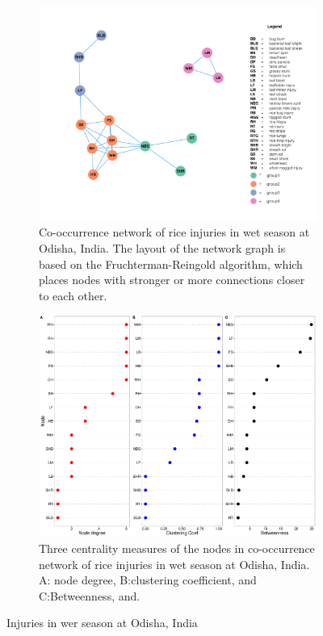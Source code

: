 \begin{figure}
    \centering
    \begin{subfigure}[b]{1\textwidth}
        \includegraphics[width = 1\textwidth]{figures/networkOR_ws/networkOR_ws.pdf}
        \caption{Co-occurrence network of rice injuries in wet season at Odisha, India. The layout of the network graph is based on the Fruchterman-Reingold algorithm, which places nodes with stronger or more connections closer to each other.}
        \label{fig:gull}
    \end{subfigure}
    \begin{subfigure}[b]{1\textwidth}
        \includegraphics[width = 1\textwidth]{figures/nodepropOR_ws/nodepropOR_ws.pdf}
        \caption{Three centrality measures of the nodes in co-occurrence network of rice injuries in wet season at Odisha, India. A: node degree, B:clustering coefficient, and C:Betweenness, and.}
        \label{fig:nodepropCP_ds}
    \end{subfigure}
    \caption{Injuries in wer season at Odisha, India}
    \label{fig:OD_ws}
\end{figure}


